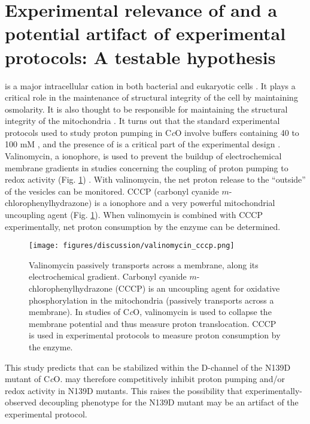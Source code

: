 \section{Experimental relevance of  and a potential artifact of experimental protocols: A testable hypothesis}

 is a major intracellular cation in both bacterial and eukaryotic cells \cite{Epstein:2003p10379}. It plays a critical role in the maintenance of structural integrity of the cell by maintaining osmolarity. It is also thought to be responsible for maintaining the structural integrity of the mitochondria \cite{Garlid:2003p10324}. It turns out that the standard experimental protocols used to study proton pumping in C\emph{c}O involve buffers containing 40 to 100 mM , and the presence of  is a critical part of the experimental design \cite{Hosler:1992p6662,Fetter:1995p6852,Namslauer:2003p6853,Lee:2009p8180,Namslauer:2010p9850,Zhu:2010p8237,Lee:2010p8614}. Valinomycin, a  ionophore, is used to prevent the buildup of electrochemical membrane gradients in studies concerning the coupling of proton pumping to redox activity (Fig. \ref{fig:valinomycin_cccp}) \cite{Namslauer:2003p6853}. With valinomycin, the net proton release to the ``outside'' of the vesicles can be monitored. CCCP (carbonyl cyanide $m$-chlorophenylhydrazone) is a  ionophore and a very powerful mitochondrial uncoupling agent (Fig. \ref{fig:valinomycin_cccp}). When valinomycin is combined with CCCP experimentally, net proton consumption by the enzyme can be determined.

\begin{figure}[htbp]
\centering
\texttt{[image: figures/discussion/valinomycin\_cccp.png]}
\caption[Valinomycin and carbonyl cyanide $m$-chlorophenylhydrazone (CCCP) passively transport  and , respectively.]{Valinomycin passively transports  across a membrane, along its electrochemical gradient. Carbonyl cyanide $m$-chlorophenylhydrazone (CCCP) is an uncoupling agent for oxidative phosphorylation in the mitochondria (passively transports  across a membrane). In studies of C\emph{c}O, valinomycin is used to collapse the membrane potential and thus measure proton translocation. CCCP is used in experimental protocols to measure proton consumption by the enzyme.}
\label{fig:valinomycin_cccp}
\end{figure}

This study predicts that  can be stabilized within the D-channel of the N139D mutant of C\emph{c}O.  may therefore competitively inhibit proton pumping and/or redox activity in N139D mutants. This raises the possibility that experimentally-observed decoupling phenotype for the N139D mutant may be an artifact of the experimental protocol.

